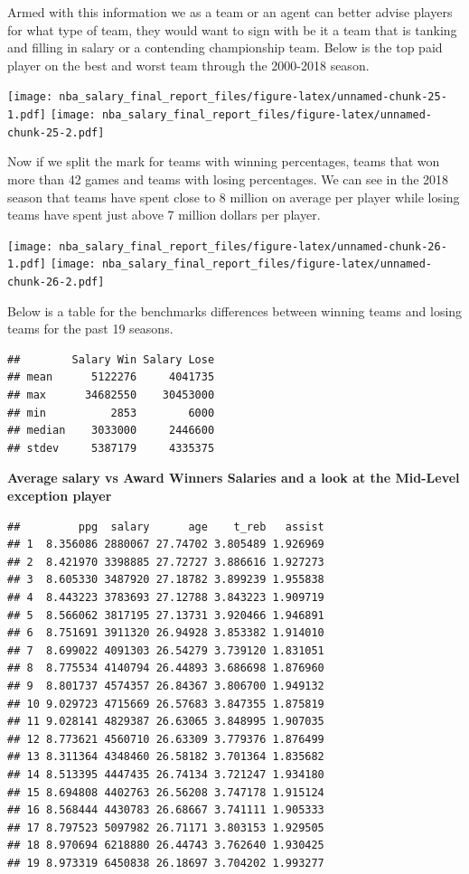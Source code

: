 \documentclass[]{article}
\begin{document}
Armed with this information we as a team or an agent can better advise
players for what type of team, they would want to sign with be it a team
that is tanking and filling in salary or a contending championship team.
Below is the top paid player on the best and worst team through the
2000-2018 season.

\texttt{[image: nba\_salary\_final\_report\_files/figure-latex/unnamed-chunk-25-1.pdf]}
\texttt{[image: nba\_salary\_final\_report\_files/figure-latex/unnamed-chunk-25-2.pdf]}

Now if we split the mark for teams with winning percentages, teams that
won more than 42 games and teams with losing percentages. We can see in
the 2018 season that teams have spent close to 8 million on average per
player while losing teams have spent just above 7 million dollars per
player.

\texttt{[image: nba\_salary\_final\_report\_files/figure-latex/unnamed-chunk-26-1.pdf]}
\texttt{[image: nba\_salary\_final\_report\_files/figure-latex/unnamed-chunk-26-2.pdf]}

Below is a table for the benchmarks differences between winning teams
and losing teams for the past 19 seasons.

\begin{verbatim}
##        Salary Win Salary Lose
## mean      5122276     4041735
## max      34682550    30453000
## min          2853        6000
## median    3033000     2446600
## stdev     5387179     4335375
\end{verbatim}

\textbf{Average salary vs Award Winners Salaries and a look at the
Mid-Level exception player}

\begin{verbatim}
##         ppg  salary      age    t_reb   assist
## 1  8.356086 2880067 27.74702 3.805489 1.926969
## 2  8.421970 3398885 27.72727 3.886616 1.927273
## 3  8.605330 3487920 27.18782 3.899239 1.955838
## 4  8.443223 3783693 27.12788 3.843223 1.909719
## 5  8.566062 3817195 27.13731 3.920466 1.946891
## 6  8.751691 3911320 26.94928 3.853382 1.914010
## 7  8.699022 4091303 26.54279 3.739120 1.831051
## 8  8.775534 4140794 26.44893 3.686698 1.876960
## 9  8.801737 4574357 26.84367 3.806700 1.949132
## 10 9.029723 4715669 26.57683 3.847355 1.875819
## 11 9.028141 4829387 26.63065 3.848995 1.907035
## 12 8.773621 4560710 26.63309 3.779376 1.876499
## 13 8.311364 4348460 26.58182 3.701364 1.835682
## 14 8.513395 4447435 26.74134 3.721247 1.934180
## 15 8.694808 4402763 26.56208 3.747178 1.915124
## 16 8.568444 4430783 26.68667 3.741111 1.905333
## 17 8.797523 5097982 26.71171 3.803153 1.929505
## 18 8.970694 6218880 26.44743 3.762640 1.930425
## 19 8.973319 6450838 26.18697 3.704202 1.993277
\end{verbatim}
\end{document}
